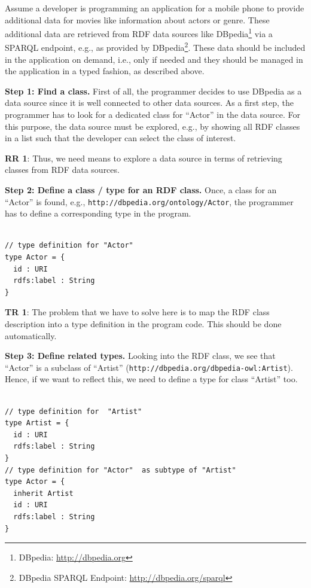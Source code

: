 \documentclass{llncs} %
\newcommand{\rr}[1]{\textbf{RR #1}}
\newcommand{\tr}[1]{\textbf{TR #1}}
\begin{document}
Assume a developer is programming an application for a mobile phone to provide additional
data for movies like information about actors or genre. These additional data
are retrieved from RDF data sources like DBpedia\footnote{DBpedia: \url{http://dbpedia.org}} via a SPARQL endpoint,
e.g., as provided by DBpedia\footnote{DBpedia SPARQL Endpoint: \url{http://dbpedia.org/sparql}}.
These data should be included in the application on demand, i.e., only if needed
and they should be managed in the application in a typed fashion,
as described above.

\vspace{0.6em}
\noindent
\textbf{Step 1: Find a class.}
First of all, the programmer decides to use DBpedia as a data source since it is well connected to other
data sources. As a first step, the programmer has to look for a dedicated class for ``Actor'' in the data source.
For this purpose, the data source must be explored, e.g., by showing all RDF classes in a list
such that the developer can select the class of interest.

\rr{1}: Thus, we need means to explore a data source in terms of retrieving classes from RDF data sources.

\vspace{0.6em}
\noindent
\textbf{Step 2: Define a class / type for  an RDF class.}
Once, a class for an ``Actor'' is found, e.g., \texttt{http://dbpedia.org/ontology/Actor}, the programmer has
to define a corresponding type in the program.

\begin{lstlisting}[style=code, caption={Type Definition for RDF Class ``Movie''}, label={lst:movietype}]

// type definition for "Actor" 
type Actor = {
  id : URI
  rdfs:label : String 
}
\end{lstlisting}

\tr{1}: The problem that we have to solve here is to map the RDF class description into a type definition in the program code.
          This should be done automatically.

\vspace{0.6em}
\noindent
\textbf{Step 3: Define related types.}
Looking into the RDF class, we see that ``Actor'' is a subclass of ``Artist'' (\texttt{http://dbpedia.org/dbpedia-owl:Artist}).
Hence, if we want to reflect this, we need to define a type for class ``Artist'' too.

\begin{lstlisting}[style=code, caption={Type Definition for RDF Classes ``Actor'' and ``Artist''}, label={lst:worktype}]

// type definition for  "Artist" 
type Artist = {
  id : URI
  rdfs:label : String
}
// type definition for "Actor"  as subtype of "Artist"
type Actor = {
  inherit Artist
  id : URI
  rdfs:label : String
}
\end{lstlisting}
\end{document}
